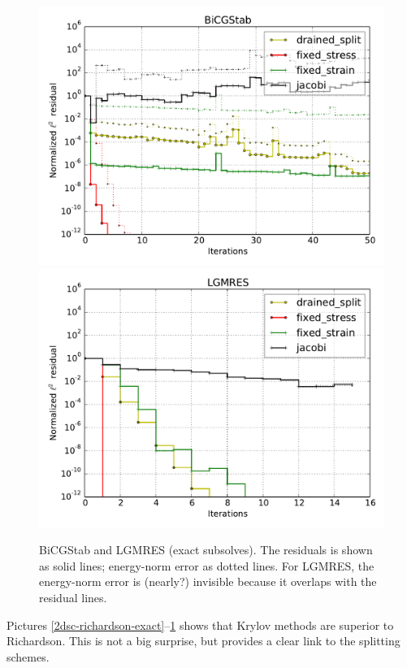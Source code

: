 \documentclass{article}
\begin{document}
\begin{figure}
\begin{center}
\includegraphics[width=0.49\linewidth]{../BiCGStab,problem=2,exact=1,N=64.pdf}
\includegraphics[width=0.49\linewidth]{../LGMRES,problem=2,exact=1,N=64,cycles=1.pdf}
\caption{BiCGStab and LGMRES (exact subsolves). The residuals is shown as solid lines; energy-norm error as dotted lines. For LGMRES, the energy-norm error is (nearly?) invisible because it overlaps with the residual lines. }
\label{2dsc-bicgstab-lgmres-exact}
\end{center}
\end{figure}

Pictures \ref{2dsc-richardson-exact}--\ref{2dsc-bicgstab-lgmres-exact} shows that Krylov methods are superior to Richardson. This is not a big surprise, but provides
a clear link to the splitting schemes.
\end{document}
